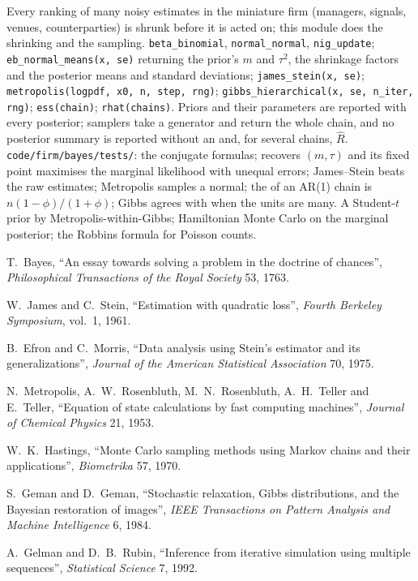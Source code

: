 \begin{build}
 Every ranking of many noisy estimates in the miniature firm (managers, signals, venues, counterparties) is shrunk before it
is acted on; this module does the shrinking and the sampling.
 \texttt{beta\_binomial}, \texttt{normal\_normal}, \texttt{nig\_update}; \texttt{eb\_normal\_means(x, se)} returning the
prior's $m$ and $\tau^2$, the shrinkage factors and the posterior means and standard deviations; \texttt{james\_stein(x, se)};
\texttt{metropolis(logpdf, x0, n, step, rng)}; \texttt{gibbs\_hierarchical(x, se, n\_iter, rng)}; \texttt{ess(chain)};
\texttt{rhat(chains)}.
 Priors and their parameters are reported with every posterior; samplers take a generator and return the whole chain, and no
posterior summary is reported without an  and, for several chains, $\hat R$.
 \texttt{code/firm/bayes/tests/}: the conjugate formulas;  recovers $(m, \tau)$ and its fixed point
maximises the marginal likelihood with unequal errors; James--Stein beats the raw estimates; Metropolis samples a normal; the  of an AR(1) chain is $n(1 - \phi)/(1 + \phi)$; Gibbs agrees with  when the units are many.
 A Student-$t$ prior by Metropolis-within-Gibbs; Hamiltonian Monte Carlo on the marginal posterior; the Robbins formula for
Poisson counts.
\end{build}

\begin{omsources}
\item T.~Bayes, ``An essay towards solving a problem in the doctrine of chances'', \emph{Philosophical Transactions of the Royal Society}
53, 1763.
\item W.~James and C.~Stein, ``Estimation with quadratic loss'', \emph{Fourth Berkeley Symposium}, vol.~1, 1961.
\item B.~Efron and C.~Morris, ``Data analysis using Stein's estimator and its generalizations'', \emph{Journal of the American Statistical
Association} 70, 1975.
\item N.~Metropolis, A.~W.~Rosenbluth, M.~N.~Rosenbluth, A.~H.~Teller and E.~Teller, ``Equation of state calculations by fast computing
machines'', \emph{Journal of Chemical Physics} 21, 1953.
\item W.~K.~Hastings, ``Monte Carlo sampling methods using Markov chains and their applications'', \emph{Biometrika} 57, 1970.
\item S.~Geman and D.~Geman, ``Stochastic relaxation, Gibbs distributions, and the Bayesian restoration of images'', \emph{IEEE
Transactions on Pattern Analysis and Machine Intelligence} 6, 1984.
\item A.~Gelman and D.~B.~Rubin, ``Inference from iterative simulation using multiple sequences'', \emph{Statistical Science} 7, 1992.
\end{omsources}

